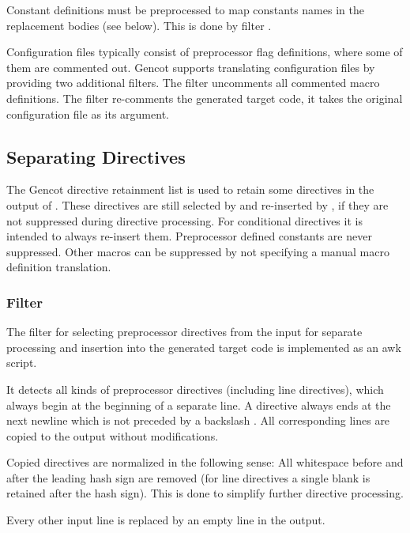 Constant definitions must be preprocessed to map constants names in the replacement bodies (see below). This
is done by filter .

Configuration files typically consist of preprocessor flag definitions, where some of them are commented out.
Gencot supports translating configuration files by providing two additional filters. The filter 
uncomments all commented macro definitions. The filter  re-comments the 
generated target code, it takes the original configuration file as its argument.

\subsection{Separating Directives}

The Gencot directive retainment list is used to retain some directives in the output of .
These directives are still selected by  and re-inserted by , if they
are not suppressed during directive processing. For conditional directives it is intended to always re-insert
them. Preprocessor defined constants are never suppressed. Other macros can be suppressed by not specifying
a manual macro definition translation.

\subsubsection{Filter }

The filter for selecting preprocessor directives from the input for separate processing and insertion into
the generated target code is implemented as an awk script.

It detects all kinds of preprocessor directives (including line directives), which always begin at the 
beginning of a separate line.
A directive always ends at the next newline which is not preceded by a backslash \code{\\}. All corresponding
lines are copied to the output without modifications.

Copied directives are normalized in the following sense: All whitespace before and after the leading hash
sign are removed (for line directives a single blank is retained after the hash sign). This is done to 
simplify further directive processing.

Every other input line is replaced by an empty line in the output.

